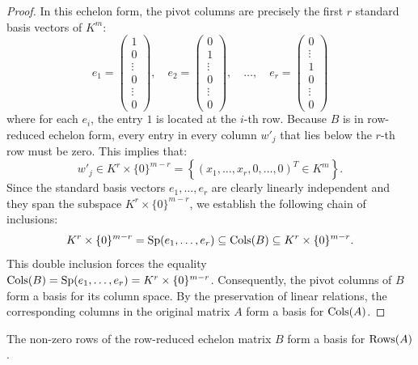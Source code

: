 \begin{proof}
In this echelon form, the pivot columns are precisely the first $r$ standard basis vectors of $K^m$:
\[
e_1 = \begin{pmatrix} 1 \\ 0 \\ \vdots \\ 0 \\ \vdots \\ 0 \end{pmatrix}, \quad 
e_2 = \begin{pmatrix} 0 \\ 1 \\ \vdots \\ 0 \\ \vdots \\ 0 \end{pmatrix}, \quad \dots, \quad 
e_r = \begin{pmatrix} 0 \\ \vdots \\ 1 \\ 0 \\ \vdots \\ 0 \end{pmatrix}
\]
where for each $e_i$, the entry $1$ is located at the $i$-th row. Because $B$ is in row-reduced echelon form, every entry in every column $w'_j$ that lies below the $r$-th row must be zero. This implies that:
\[
w'_j \in K^r \times \{0\}^{m-r} = \left\{ (x_1, \dots, x_r, 0, \dots, 0)^{T} \in K^m \right\}.
\]
Since the standard basis vectors $e_1, \dots, e_r$ are clearly linearly independent and they span the subspace $K^r \times \{0\}^{m-r}$, we establish the following chain of inclusions:
\[
K^r \times \{0\}^{m-r} = \operatorname{Sp}(e_1, \dots, e_r) \subseteq \operatorname{Cols}(B) \subseteq K^r \times \{0\}^{m-r}.
\]
This double inclusion forces the equality $\operatorname{Cols}(B) = \operatorname{Sp}(e_1, \dots, e_r) = K^r \times \{0\}^{m-r}$. Consequently, the pivot columns of $B$ form a basis for its column space. By the preservation of linear relations, the corresponding columns in the original matrix $A$ form a basis for $\operatorname{Cols}(A)$.
\end{proof}

\begin{theorem}
\label{thm:row_basis}
The non-zero rows of the row-reduced echelon matrix $B$ form a basis for $\operatorname{Rows}(A)$.
\end{theorem}

